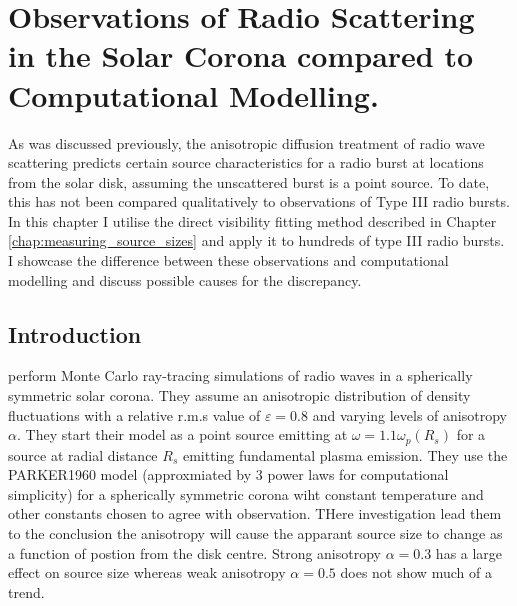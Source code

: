 \doublespacing
\chapter{Observations of Radio Scattering in the Solar Corona compared to Computational Modelling.}
\label{chap:observations_vs_theory}
As was discussed previously, the anisotropic diffusion treatment of radio wave scattering predicts certain source characteristics for a radio burst at locations from the solar disk, assuming the unscattered burst is a point source. To date, this has not been compared qualitatively to observations of Type III radio bursts. In this chapter I utilise the direct visibility fitting method described in Chapter \ref{chap:measuring_source_sizes} and apply it to hundreds of type III radio bursts. I showcase the difference between these observations and computational modelling and discuss possible causes for the discrepancy.

\section{Introduction}
\label{sec:obsvtheory_intro}
\cite{Kontar2019} perform Monte Carlo ray-tracing simulations of radio waves in a spherically symmetric solar corona. They assume an anisotropic distribution of density fluctuations with a relative r.m.s value of $\varepsilon = 0.8$ and varying levels of anisotropy $\alpha$. They start their model as a point source emitting at $\omega = 1.1 \omega_p(R_s)$ for a source at radial distance $R_s$ emitting fundamental plasma emission. They use the PARKER1960\cite{Parker1960} model (approxmiated by 3 power laws for computational simplicity) for a spherically symmetric corona wiht constant temperature and other constants chosen to agree with observation.	
THere investigation lead them to the conclusion the anisotropy will cause the apparant source size to change as a function of postion from the disk centre. Strong anisotropy $\alpha = 0.3$ has a large effect on source size whereas weak anisotropy $\alpha = 0.5$ does not show much of a trend.

